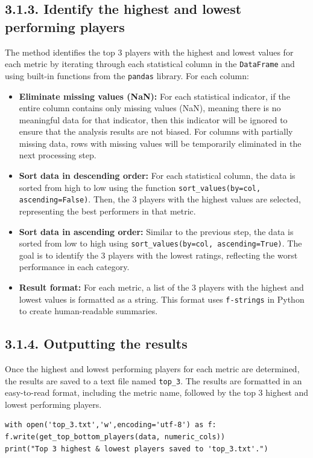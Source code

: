 \documentclass[a4paper,12pt]{article}
\begin{document}
\subsection*{\textbf{3.1.3. Identify the highest and lowest performing players}}
The method identifies the top 3 players with the highest and lowest values for each metric by iterating through each statistical column in the \texttt{DataFrame} and using built-in functions from the \texttt{pandas} library. For each column:
\begin{itemize}
    \item \textbf{Eliminate missing values (NaN):} For each statistical indicator, if the entire column contains only missing values (NaN), meaning there is no meaningful data for that indicator, then this indicator will be ignored to ensure that the analysis results are not biased. For columns with partially missing data, rows with missing values will be temporarily eliminated in the next processing step.
    
    \item \textbf{Sort data in descending order:} For each statistical column, the data is sorted from high to low using the function \texttt{sort\_values(by=col, ascending=False)}. Then, the 3 players with the highest values are selected, representing the best performers in that metric.
    
    \item \textbf{Sort data in ascending order:} Similar to the previous step, the data is sorted from low to high using \texttt{sort\_values(by=col, ascending=True)}. The goal is to identify the 3 players with the lowest ratings, reflecting the worst performance in each category.
    \item \textbf{Result format:} For each metric, a list of the 3 players with the highest and lowest values is formatted as a string. This format uses \texttt{f-strings} in Python to create human-readable summaries.

\end{itemize}
\subsection*{\textbf{3.1.4. Outputting the results}}
Once the highest and lowest performing players for each metric are determined, the results are saved to a text file named \texttt{top\_3}. The results are formatted in an easy-to-read format, including the metric name, followed by the top 3 highest and lowest performing players.
\begin{mdframed}
\begin{verbatim}
with open('top_3.txt','w',encoding='utf-8') as f: 
f.write(get_top_bottom_players(data, numeric_cols))
print("Top 3 highest & lowest players saved to 'top_3.txt'.")
\end{verbatim}
\end{mdframed}
\end{document}
